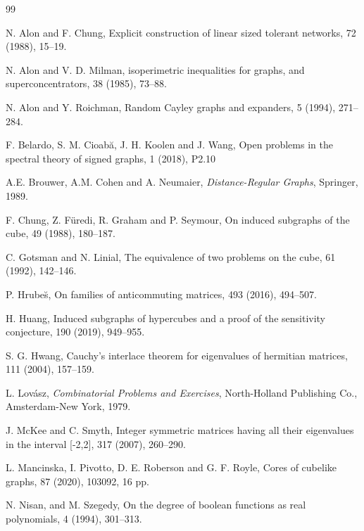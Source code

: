 \documentclass[11pt]{article}
\begin{document}
\begin{thebibliography}{99}

N. Alon and F. Chung,
\newblock Explicit construction of linear sized tolerant networks,
 72 (1988), 15--19.

N. Alon and V. D. Milman, 
 isoperimetric inequalities for graphs, and
superconcentrators,
 38 (1985), 73--88.

N. Alon and Y. Roichman, 
\newblock Random Cayley graphs and expanders,
 5 (1994), 271--284.

F. Belardo, S. M.  Cioab\u{a}, J. H. Koolen and J. Wang, 
\newblock Open problems in the spectral theory of signed graphs,
 1 (2018), P2.10

\newblock A.E. Brouwer, A.M. Cohen and A. Neumaier, 
{\em Distance-Regular Graphs}, Springer, 1989.

F. Chung, Z. F{\"u}redi, R. Graham and P. Seymour, 
\newblock On induced subgraphs of the cube,
 49 (1988), 180--187.

C. Gotsman and N. Linial, 
\newblock The equivalence of two problems on the cube,
 61 (1992), 142--146.

P. Hrube\u{s}, 
\newblock On families of anticommuting matrices,
 493 (2016), 494--507.

H. Huang, 
\newblock Induced subgraphs of hypercubes and a proof of the sensitivity conjecture,
 190 (2019), 949--955.

S. G. Hwang, 
\newblock Cauchy's interlace theorem for eigenvalues of hermitian matrices,
 111 (2004), 157--159.

L. Lov\'{a}sz, 
{\em Combinatorial Problems and Exercises},
North-Holland Publishing Co., Amsterdam-New York, 1979.

J. McKee and C. Smyth, 
\newblock Integer symmetric matrices having all their eigenvalues in the
interval [-2,2],
 317 (2007), 260--290.

L. Mancinska, I. Pivotto, D. E. Roberson and G. F. Royle, 
\newblock Cores of cubelike graphs, 
 87 (2020), 103092, 16 pp.

N. Nisan, and M. Szegedy, 
\newblock On the degree of boolean functions as real polynomials,
 4 (1994), 301--313.



\end{thebibliography}
\end{document}
